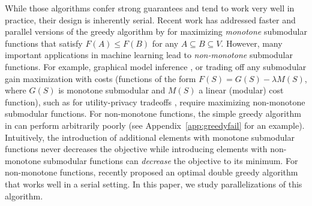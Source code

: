 \documentclass{article} %
\newcommand{\Comments}{1}
\newcommand{\note}[2]{\ifnum\Comments=1\textcolor{#1}{#2}\fi}
\newcommand{\joey}[1]{\note{blue}{[JG: #1]}}
\begin{document}
While those algorithms confer strong guarantees and tend to work very well in practice, their design is inherently serial.
%
Recent work has addressed faster \cite{badan14,wei14} and parallel \cite{Mirzasoleiman2013,kumar13} versions of the greedy algorithm by \citet{nemhauser1978} for maximizing \emph{monotone} submodular functions that satisfy $F(A) \leq F(B)$ for any $A \subseteq B \subseteq V$.
However, many important applications in machine learning lead to \emph{non-monotone} submodular functions.
For example, graphical model inference \cite{gillenwater12,reed13}, or trading off any submodular gain maximization with costs (functions of the form $F(S) = G(S) - \lambda M(S)$, where $G(S)$ is monotone submodular and $M(S)$ a linear (modular) cost function), such as for utility-privacy tradeoffs \cite{krause10priv},
 require maximizing non-monotone submodular functions.
For non-monotone functions, the simple greedy algorithm in \cite{nemhauser1978} can perform arbitrarily poorly (see Appendix~\ref{app:greedyfail} for an example).
Intuitively, the introduction of additional elements with monotone submodular functions never decreases the objective while introducing elements with non-monotone submodular functions can \emph{decrease} the objective to its minimum.
For non-monotone functions, \citet{buchbinder2012} recently proposed an optimal double greedy algorithm that works well in a serial setting. In this paper, we study parallelizations of this algorithm.

\end{document}
